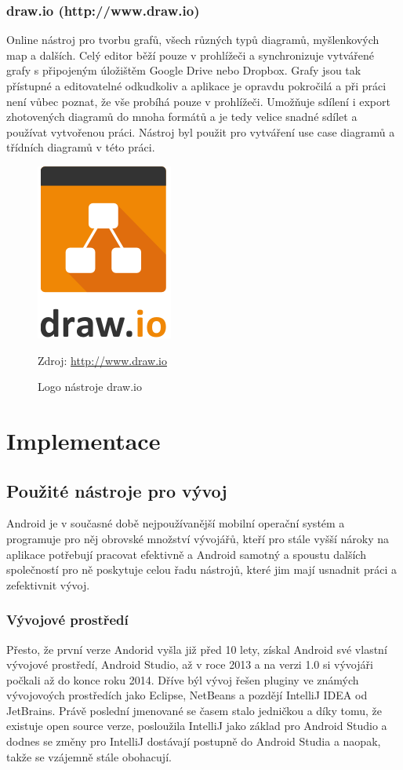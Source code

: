 \documentclass{article}
\begin{document}
\subsubsection{draw.io (http://www.draw.io)}
Online nástroj pro tvorbu grafů, všech různých typů diagramů, myšlenkových map a dalších.
Celý editor běží pouze v prohlížeči a synchronizuje vytvářené grafy s připojeným úložištěm
Google Drive nebo Dropbox. Grafy jsou tak přístupné  a editovatelné odkudkoliv a aplikace
je opravdu pokročilá a při práci není vůbec poznat, že vše probíhá pouze v prohlížeči.
Umožňuje sdílení i export zhotovených diagramů do mnoha formátů a je tedy velice snadné
sdílet a používat vytvořenou práci.
Nástroj byl použit pro vytváření use case diagramů a třídních diagramů v této práci.
\begin{figure}[H]
        \centering
                \includegraphics[scale=0.2]{img/drawiologo.png}
        \caption{Logo nástroje draw.io}
        \label{fig:iologo}
        \centering Zdroj: \url{http://www.draw.io}
\end{figure}



\section{Implementace}

\subsection{Použité nástroje pro vývoj}
Android je v současné době nejpoužívanější mobilní operační systém a programuje pro něj obrovské
množství vývojářů, kteří pro stále vyšší nároky na aplikace potřebují pracovat efektivně a Android samotný
a spoustu dalších společností pro ně poskytuje celou řadu nástrojů, které jim mají usnadnit práci a zefektivnit vývoj.

\subsubsection{Vývojové prostředí}
Přesto, že první verze Andorid vyšla již před 10 lety, získal Android své vlastní vývojové prostředí, Android Studio,
až v roce 2013 a na verzi 1.0 si vývojáři počkali až do konce roku 2014. Dříve býl vývoj řešen pluginy ve známých
vývojovoých prostředích jako Eclipse, NetBeans a pozdějí IntelliJ IDEA od JetBrains. Právě poslední jmenované
se časem stalo jedničkou a díky tomu, že existuje open source verze, posloužila IntelliJ jako základ pro Android Studio
a dodnes se změny pro IntelliJ dostávají postupně do Android Studia a naopak, takže se vzájemně stále obohacují.
\end{document}
